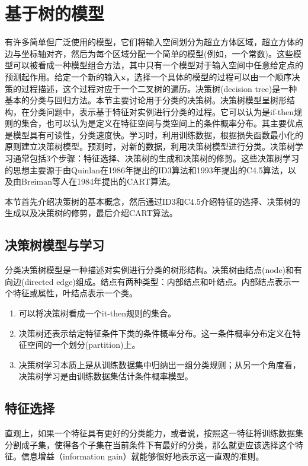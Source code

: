 \section{基于树的模型}
有许多简单但广泛使用的模型，它们将输入空间划分为超立方体区域，超立方体的边与坐标轴对齐，然后为每个区域分配一个简单的模型(例如，一个常数)。这些模型可以被看成一种模型组合方法，其中只有一个模型对于输入空间中任意给定点的预测起作用。给定一个新的输入$\boldsymbol{x}$，选择一个具体的模型的过程可以由一个顺序决策的过程描述，这个过程对应于一个二叉树的遍历。决策树(decision tree)是一种基本的分类与回归方法。本节主要讨论用于分类的决策树。决策树模型呈树形结构，在分类问题中，表示基于特征对实例进行分类的过程。它可以认为是if-then规则的集合，也可以认为是定义在特征空间与类空间上的条件概率分布。其主要优点是模型具有可读性，分类速度快。学习时，利用训练数据，根据损失函数最小化的原则建立决策树模型。预测时，对新的数据，利用决策树模型进行分类。决策树学习通常包括3个步骤：特征选择、决策树的生成和决策树的修剪。这些决策树学习的思想主要源于由Quinlan在1986年提出的ID3算法和1993年提出的C4.5算法，以及由Breiman等人在1984年提出的CART算法。

本节首先介绍决策树的基本概念，然后通过ID3和C4.5介绍特征的选择、决策树的生成以及决策树的修剪，最后介绍CART算法。

\subsection*{决策树模型与学习}
分类决策树模型是一种描述对实例进行分类的树形结构。决策树由结点(node)和有向边(directed edge)组成。结点有两种类型：内部结点和叶结点。内部结点表示一个特征或属性，叶结点表示一个类。
\begin{enumerate}
	\item 可以将决策树看成一个it-then规则的集合。
	\item 决策树还表示给定特征条件下类的条件概率分布。这一条件概率分布定义在特征空间的一个划分(partition)上。
	\item 决策树学习本质上是从训练数据集中归纳出一组分类规则；从另一个角度看，决策树学习是由训练数据集估计条件概率模型。
\end{enumerate}

\subsection*{特征选择}
直观上，如果一个特征具有更好的分类能力，或者说，按照这一特征将训练数据集分割成子集，使得各个子集在当前条件下有最好的分类，那么就更应该选择这个特征。信息增益（information gain）就能够很好地表示这一直观的准则。

